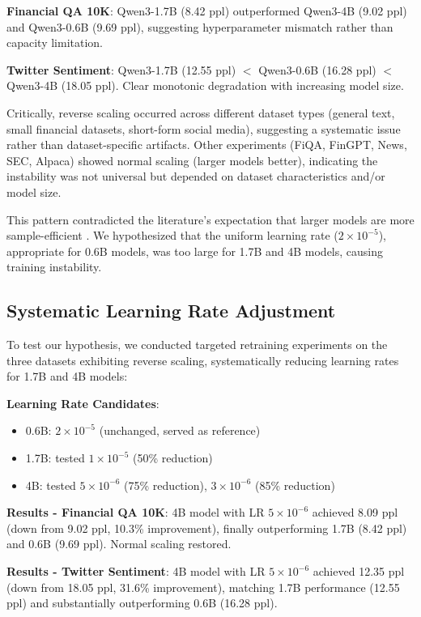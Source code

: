 \textbf{Financial QA 10K}: Qwen3-1.7B (8.42 ppl) outperformed Qwen3-4B (9.02 ppl) and Qwen3-0.6B (9.69 ppl), suggesting hyperparameter mismatch rather than capacity limitation.

\textbf{Twitter Sentiment}: Qwen3-1.7B (12.55 ppl) $<$ Qwen3-0.6B (16.28 ppl) $<$ Qwen3-4B (18.05 ppl). Clear monotonic degradation with increasing model size.

Critically, reverse scaling occurred across different dataset types (general text, small financial datasets, short-form social media), suggesting a systematic issue rather than dataset-specific artifacts. Other experiments (FiQA, FinGPT, News, SEC, Alpaca) showed normal scaling (larger models better), indicating the instability was not universal but depended on dataset characteristics and/or model size.

This pattern contradicted the literature's expectation that larger models are more sample-efficient \parencite{kaplan2020scaling}. We hypothesized that the uniform learning rate ($2 \times 10^{-5}$), appropriate for 0.6B models, was too large for 1.7B and 4B models, causing training instability.

\subsection{Systematic Learning Rate Adjustment}

To test our hypothesis, we conducted targeted retraining experiments on the three datasets exhibiting reverse scaling, systematically reducing learning rates for 1.7B and 4B models:

\textbf{Learning Rate Candidates}:
\begin{itemize}
\item 0.6B: $2 \times 10^{-5}$ (unchanged, served as reference)
\item 1.7B: tested $1 \times 10^{-5}$ (50\% reduction)
\item 4B: tested $5 \times 10^{-6}$ (75\% reduction), $3 \times 10^{-6}$ (85\% reduction)
\end{itemize}

\textbf{Results - Financial QA 10K}: 4B model with LR $5 \times 10^{-6}$ achieved 8.09 ppl (down from 9.02 ppl, 10.3\% improvement), finally outperforming 1.7B (8.42 ppl) and 0.6B (9.69 ppl). Normal scaling restored.

\textbf{Results - Twitter Sentiment}: 4B model with LR $5 \times 10^{-6}$ achieved 12.35 ppl (down from 18.05 ppl, 31.6\% improvement), matching 1.7B performance (12.55 ppl) and substantially outperforming 0.6B (16.28 ppl).

